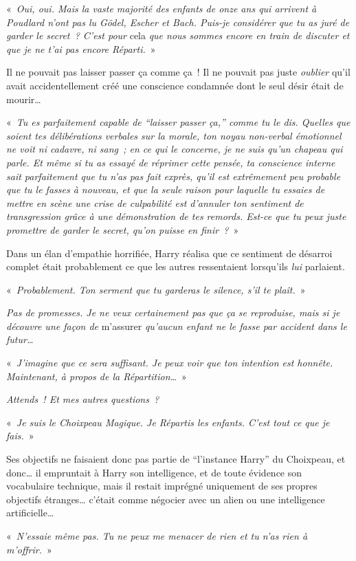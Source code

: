 «~\emph{Oui, oui.
Mais la vaste majorité des enfants de onze ans qui arrivent à Poudlard n'ont pas lu Gödel, Escher et Bach.
Puis-je considérer que tu as juré de garder le secret~?
C'est pour} cela \emph{que nous sommes encore en train de discuter et que je ne t'ai pas encore Réparti.}~»

Il ne pouvait pas laisser passer ça comme ça~!
Il ne pouvait pas juste \emph{oublier} qu'il avait accidentellement créé une conscience condamnée dont le seul désir était de mourir…

«~\emph{Tu es parfaitement capable de “laisser passer ça,” comme tu le dis.
Quelles que soient tes délibérations verbales sur la morale, ton noyau non-verbal émotionnel ne voit ni cadavre, ni sang~;
en ce qui le concerne, je ne suis qu'un chapeau qui parle.
Et même si tu as essayé de réprimer cette pensée, ta conscience interne sait parfaitement que tu n'as pas fait exprès, qu'il est extrêmement peu probable que tu le fasses à nouveau, et que la seule raison pour laquelle tu essaies de mettre en scène une crise de culpabilité est d'annuler ton sentiment de transgression grâce à une démonstration de tes remords.
Est-ce que tu peux juste promettre de garder le secret, qu'on puisse en finir~?}~»

Dans un élan d'empathie horrifiée, Harry réalisa que ce sentiment de désarroi complet était probablement ce que les autres ressentaient lorsqu'ils \emph{lui} parlaient.

«~\emph{Probablement. Ton serment que tu garderas le silence, s'il te plaît.}~»

\emph{Pas de promesses. Je ne veux certainement pas que ça se reproduise, mais si je découvre une façon de} m'assurer \emph{qu'aucun enfant ne le fasse par accident dans le futur…}

«~\emph{J'imagine que ce sera suffisant. Je peux voir que ton intention est honnête. Maintenant, à propos de la Répartition…}~»

\emph{Attends~! Et mes autres questions~?}

«~\emph{Je suis le Choixpeau Magique. Je Répartis les enfants. C'est tout ce que je fais.}~»

Ses objectifs ne faisaient donc pas partie de “l'instance Harry” du Choixpeau, et donc… il empruntait à Harry son intelligence, et de toute évidence son vocabulaire technique, mais il restait imprégné uniquement de ses propres objectifs étranges… c'était comme négocier avec un alien ou une intelligence artificielle…

«~\emph{N'essaie même pas. Tu ne peux me menacer de rien et tu n'as rien à m'offrir.}~»


